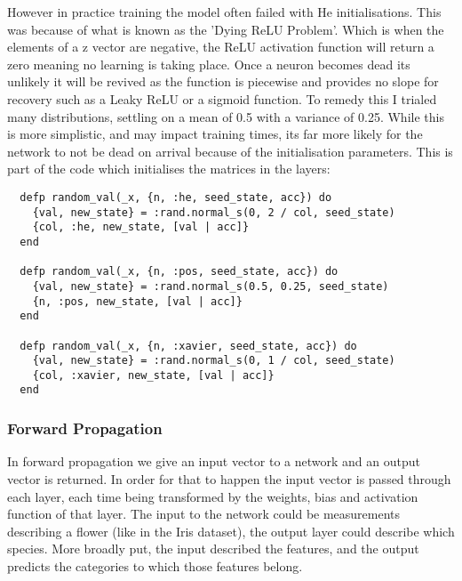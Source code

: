 However in practice training the model often failed with He initialisations.
This was because of what is known as the 'Dying ReLU Problem'. Which is when the
elements of a z vector are negative, the ReLU activation function
will return a zero meaning no learning is taking place. Once a neuron becomes
dead its unlikely it will be revived as the function is piecewise and provides
no slope for recovery such as a Leaky ReLU or a sigmoid function. To remedy this
I trialed many distributions, settling on a mean of 0.5 with a variance of 0.25.
While this is more simplistic, and may impact training times, its far more
likely for the network to not be dead on arrival because of the initialisation
parameters. This is part of the code which initialises the matrices in the layers:
\begin{lstlisting}
  defp random_val(_x, {n, :he, seed_state, acc}) do
    {val, new_state} = :rand.normal_s(0, 2 / col, seed_state)
    {col, :he, new_state, [val | acc]}
  end

  defp random_val(_x, {n, :pos, seed_state, acc}) do
    {val, new_state} = :rand.normal_s(0.5, 0.25, seed_state)
    {n, :pos, new_state, [val | acc]}
  end

  defp random_val(_x, {n, :xavier, seed_state, acc}) do
    {val, new_state} = :rand.normal_s(0, 1 / col, seed_state)
    {col, :xavier, new_state, [val | acc]}
  end
\end{lstlisting} 


\subsubsection{Forward Propagation}
In forward propagation we give an input vector to a network and an output vector
is returned. In order for that to happen the input vector is passed through each
layer, each time being transformed by the weights, bias and activation function
of that layer. The input to the network could be measurements describing a
flower (like in the Iris dataset), the output layer could describe which
species. More broadly put, the input described the features, and the output
predicts the categories to which those features belong.

